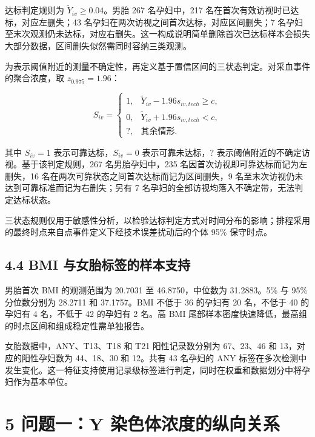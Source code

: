 \documentclass[UTF8,fontset=fandol,zihao=-4,a4paper]{ctexart}
\begin{document}
达标判定规则为 \(\widetilde Y_{iv}\ge0.04\)。男胎 267
名孕妇中，217 名在首次有效访视时已达标，对应左删失；43
名孕妇在两次访视之间首次达标，对应区间删失；7
名孕妇至末次观测仍未达标，对应右删失。这一构成说明简单删除首次已达标样本会损失大部分数据，区间删失似然需同时容纳三类观测。

为表示阈值附近的测量不确定性，再定义基于置信区间的三状态判定。对采血事件的聚合浓度，取
\(z_{0.975}=1.96\)：

\[
S_{iv}=
\begin{cases}
1, & \widetilde Y_{iv}-1.96\widehat s_{iv,tech}\ge c,\\
0, & \widetilde Y_{iv}+1.96\widehat s_{iv,tech}<c,\\
?, & \text{其余情形}.
\end{cases}
\tag{4}
\]

其中 \(S_{iv}=1\) 表示可靠达标，\(S_{iv}=0\) 表示可靠未达标，\(?\)
表示阈值附近的不确定访视。基于该判定规则，267 名男胎孕妇中，235
名因首次访视即可靠达标而记为左删失，16 名在两次可靠状态之间首次达标而记为区间删失，9
名至末次访视仍未达到可靠标准而记为右删失；另有 7
名孕妇的全部访视均落入不确定带，无法判定达标状态。

三状态规则仅用于敏感性分析，以检验达标判定方式对时间分布的影响；排程采用的最终时点来自点事件定义下经技术误差扰动后的个体
95\% 保守时点。

\subsection{4.4 BMI
与女胎标签的样本支持}\label{bmi-ux4e0eux5973ux80ceux6807ux7b7eux7684ux6837ux672cux652fux6301}

男胎首次 BMI 的观测范围为 20.7031 至 46.8750，中位数为 31.2883。5\% 与
95\% 分位数分别为 28.2711 和 37.1757。BMI 不低于 36 的孕妇有 20
名，不低于 40 的孕妇有 4 名，不低于 42 的孕妇有 2 名。高 BMI
尾部样本密度快速降低，最高组的时点区间和组成稳定性需单独报告。

女胎数据中，ANY、T13、T18 和 T21 阳性记录数分别为 67、23、46 和
13，对应的阳性孕妇数为 44、18、30 和 12。共有 43 名孕妇的 ANY
标签在多次检测中发生变化。这一特征支持使用记录级标签进行判定，同时在权重和数据划分中将孕妇作为基本单位。

\section{5 问题一：Y
染色体浓度的纵向关系}\label{ux95eeux9898ux4e00y-ux67d3ux8272ux4f53ux6d53ux5ea6ux7684ux7eb5ux5411ux5173ux7cfb}
\end{document}
